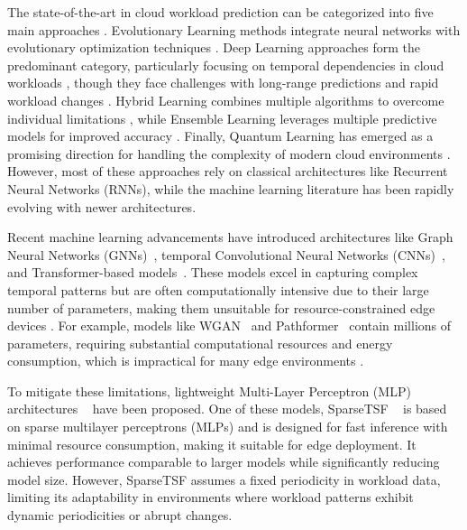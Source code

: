\documentclass{ieeetmlcn}
\begin{document}
The state-of-the-art in cloud workload prediction can be categorized into five main approaches \cite{kumar2018workload, tang2019large}. Evolutionary Learning methods integrate neural networks with evolutionary optimization techniques \cite{kumar2021self}. Deep Learning approaches form the predominant category, particularly focusing on temporal dependencies in cloud workloads \cite{zhang2018efficient, zhang2017resource}, though they face challenges with long-range predictions and rapid workload changes \cite{hochreiter1998vanishing}. Hybrid Learning combines multiple algorithms to overcome individual limitations \cite{kardani2020adrl, karim2021bhyprec}, while Ensemble Learning leverages multiple predictive models for improved accuracy \cite{singh2014ensemble, iqbal2019adaptive}. Finally, Quantum Learning has emerged as a promising direction for handling the complexity of modern cloud environments \cite{singh2021quantum}. However, most of these approaches rely on classical architectures like Recurrent Neural Networks (RNNs), while the machine learning literature has been rapidly evolving with newer architectures.

Recent machine learning advancements have introduced architectures like Graph Neural Networks (GNNs)~\cite{yi2024fouriergnn}, temporal Convolutional Neural Networks (CNNs)~\cite{donghao2024moderntcn}, and Transformer-based models~\cite{gort2024forecasting}. These models excel in capturing complex temporal patterns but are often computationally intensive due to their large number of parameters, making them unsuitable for resource-constrained edge devices \cite{meuser2024revisiting}. For example, models like WGAN~\cite{arbat2022wassersteinadversarialtransformercloud} and Pathformer~\cite{pathformer2024} contain millions of parameters, requiring substantial computational resources and energy consumption, which is impractical for many edge environments \cite{kong2022edge}.

To mitigate these limitations, lightweight Multi-Layer Perceptron (MLP) architectures ~\cite{ekambaram2023tsmixer} have been proposed. One of these models, SparseTSF ~\cite{sparseTSF} is based on sparse multilayer perceptrons (MLPs) and is designed for fast inference with minimal resource consumption, making it suitable for edge deployment. It achieves performance comparable to larger models while significantly reducing model size. However, SparseTSF assumes a fixed periodicity in workload data, limiting its adaptability in environments where workload patterns exhibit dynamic periodicities or abrupt changes.
\end{document}
